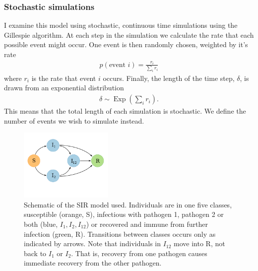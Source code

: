 \subsubsection{Stochastic simulations}

I examine this model using stochastic, continuous time simulations using the Gillespie algorithm.
At each step in the simulation we calculate the rate that each possible event might occur.
One event is then randomly chosen, weighted by it's rate
\begin{align}
  p(\text{event } i) = \frac{r_i}{\sum_i r_i}
\end{align}
where $r_i$ is the rate that event $i$ occurs.
Finally, the length of the time step, $\delta$, is drawn from an exponential distribution 
\begin{align}
  \delta \sim \operatorname{Exp}\left(\sum_i r_i  \right).
\end{align}
This means that the total length of each simulation is stochastic. 
We define the number of events we wish to simulate instead.


\begin{figure}[t]
\centering
  \includegraphics[width=0.4\textwidth]{imgs/SIRoption1.pdf}
  \caption{
Schematic of the SIR model used. 
Individuals are in one five classes, susceptible (orange, S), infectious with pathogen 1, pathogen 2 or both (blue, $I_1, I_2, I_{12}$) or recovered and immune from further infection (green, R).
Transitions between classes occurs only as indicated by arrows.
Note that individuals in $I_{12}$ move into R, not back to $I_1$ or $I_2$. 
That is, recovery from one pathogen causes immediate recovery from the other pathogen.
}
  \label{f:sir}
\end{figure}


